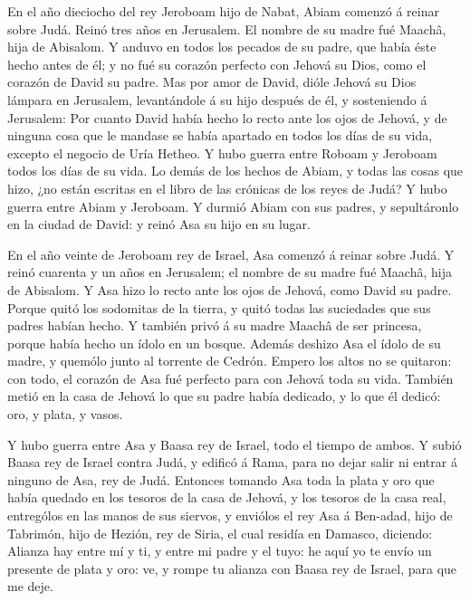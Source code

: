  En el año dieciocho del rey Jeroboam hijo de Nabat, Abiam
comenzó á reinar sobre Judá.  Reinó tres años en Jerusalem.
El nombre de su madre fué Maachâ, hija de Abisalom.  Y
anduvo en todos los pecados de su padre, que había éste hecho antes de
él; y no fué su corazón perfecto con Jehová su Dios, como el corazón de
David su padre.  Mas por amor de David, dióle Jehová su Dios
lámpara en Jerusalem, levantándole á su hijo después de él, y
sosteniendo á Jerusalem:  Por cuanto David había hecho lo
recto ante los ojos de Jehová, y de ninguna cosa que le mandase se había
apartado en todos los días de su vida, excepto el negocio de Uría
Hetheo.  Y hubo guerra entre Roboam y Jeroboam todos los
días de su vida.  Lo demás de los hechos de Abiam, y todas
las cosas que hizo, ¿no están escritas en el libro de las crónicas de
los reyes de Judá? Y hubo guerra entre Abiam y Jeroboam.  Y
durmió Abiam con sus padres, y sepultáronlo en la ciudad de David: y
reinó Asa su hijo en su lugar.

 En el año veinte de Jeroboam rey de Israel, Asa comenzó á
reinar sobre Judá.  Y reinó cuarenta y un años en
Jerusalem; el nombre de su madre fué Maachâ, hija de Abisalom.
 Y Asa hizo lo recto ante los ojos de Jehová, como David su
padre.  Porque quitó los sodomitas de la tierra, y quitó
todas las suciedades que sus padres habían hecho.  Y
también privó á su madre Maachâ de ser princesa, porque había hecho un
ídolo en un bosque. Además deshizo Asa el ídolo de su madre, y quemólo
junto al torrente de Cedrón.  Empero los altos no se
quitaron: con todo, el corazón de Asa fué perfecto para con Jehová toda
su vida.  También metió en la casa de Jehová lo que su
padre había dedicado, y lo que él dedicó: oro, y plata, y vasos.

 Y hubo guerra entre Asa y Baasa rey de Israel, todo el
tiempo de ambos.  Y subió Baasa rey de Israel contra Judá,
y edificó á Rama, para no dejar salir ni entrar á ninguno de Asa, rey de
Judá.  Entonces tomando Asa toda la plata y oro que había
quedado en los tesoros de la casa de Jehová, y los tesoros de la casa
real, entrególos en las manos de sus siervos, y enviólos el rey Asa á
Ben-adad, hijo de Tabrimón, hijo de Hezión, rey de Siria, el cual
residía en Damasco, diciendo:  Alianza hay entre mí y ti, y
entre mi padre y el tuyo: he aquí yo te envío un presente de plata y
oro: ve, y rompe tu alianza con Baasa rey de Israel, para que me deje.

